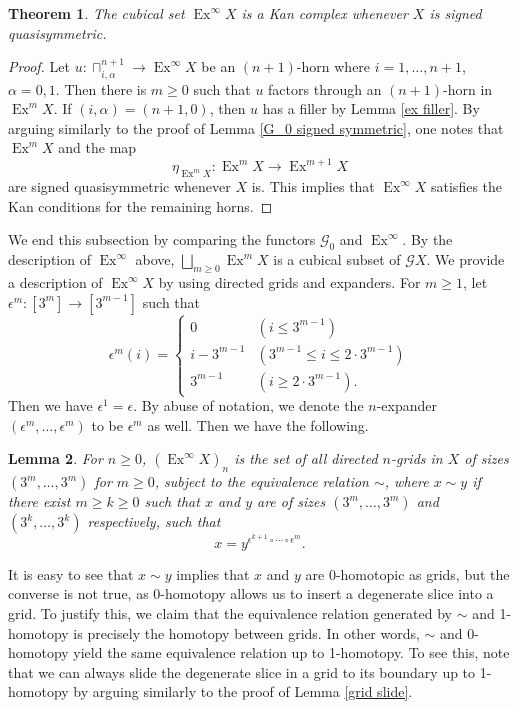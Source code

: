 \documentclass[oneside, 12pt]{amsart}
\numberwithin{equation}{section}
\theoremstyle{plain}
\newtheorem{theorem}{Theorem}[section]
\newtheorem{lemma}[theorem]{Lemma}
\theoremstyle{definition}
\theoremstyle{remark}
\newcommand{\cSet}{\mathsf{cSet}}
\newcommand{\ex}{\operatorname{Ex}}
\begin{document}
	\begin{theorem}
		The cubical set $\ex^\infty X$ is a Kan complex whenever $X$ is signed quasisymmetric. %
	\end{theorem}
	\begin{proof}
		Let $u\colon\sqcap_{i,\alpha}^{n+1}\to\ex^\infty X$ be an $(n+1)$-horn where $i=1,\ldots,n+1$, $\alpha=0,1$. Then there is $m\ge0$ such that $u$ factors through an $(n+1)$-horn in $\ex^m X$. If $(i,\alpha)=(n+1,0)$, then $u$ has a filler by Lemma \ref{ex filler}. By arguing similarly to the proof of Lemma \ref{G_0 signed symmetric}, one notes that $\ex^m X$ and the map
		\[
		\eta_{\ex^mX}\colon\ex^mX\to\ex^{m+1}X
		\]
		are signed quasisymmetric whenever $X$ is. This implies that $\ex^\infty X$ satisfies the Kan conditions for the remaining horns.
	\end{proof}
	We end this subsection by comparing the functors $\mathcal{G}_0$ and $\ex^\infty$. By the description of $\ex^\infty$ above, $\bigsqcup_{m\ge0}\ex^mX$ is a cubical subset of $\mathcal{G}X$. We provide a description of $\ex^\infty X$ by using directed grids and expanders. For $m\ge1$, let $\epsilon^m\colon[3^{m}]\to[3^{m-1}]$ such that
	\[
	\epsilon^m(i)=\begin{cases}
		0&(i\le3^{m-1})\\
		i-3^{m-1}&(3^{m-1}\le i\le2\cdot3^{m-1})\\
		3^{m-1}&(i\ge2\cdot3^{m-1}).
	\end{cases}
	\]
	Then we have $\epsilon^1=\epsilon$. By abuse of notation, we denote the $n$-expander $(\epsilon^m,\ldots,\epsilon^m)$ to be $\epsilon^m$ as well. Then we have the following.
	\begin{lemma}
		\label{ex description}
		For $n\ge0$, $(\ex^\infty X)_n$ is the set of all directed $n$-grids in $X$ of sizes $(3^m,\ldots,3^m)$ for $m\ge0$, subject to the equivalence relation $\sim$,
		where $x\sim y$ if there exist $m\ge k\ge0$ such that $x$ and $y$ are of sizes $(3^m,\ldots,3^m)$ and $(3^k,\ldots,3^k)$ respectively, such that
		\[
		x=y^{\epsilon^{k+1}\circ\cdots\circ\epsilon^m}.
		\]
	\end{lemma}
	It is easy to see that $x\sim y$ implies that $x$ and $y$ are 0-homotopic as grids, but the converse is not true, as 0-homotopy allows us to insert a degenerate slice into a grid. To justify this, we claim that the equivalence relation generated by $\sim$ and 1-homotopy is precisely the homotopy between grids. In other words, \(\sim\) and 0-homotopy yield the same equivalence relation up to 1-homotopy. To see this, note that we can always slide the degenerate slice in a grid to its boundary up to 1-homotopy by arguing similarly to the proof of Lemma \ref{grid slide}. 
	
\end{document}

